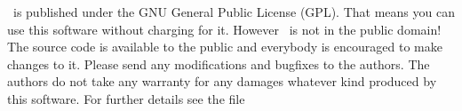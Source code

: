 \cp\ is published under the GNU General Public License (GPL). That means you
can use this software without charging for it. However \cp\ is not in the public domain!
The source code is
available to the public and everybody is encouraged to make changes to it.
Please send any modifications and bugfixes to the authors. The authors do not
take any warranty for any damages whatever kind produced by this software.
For further details see the file
